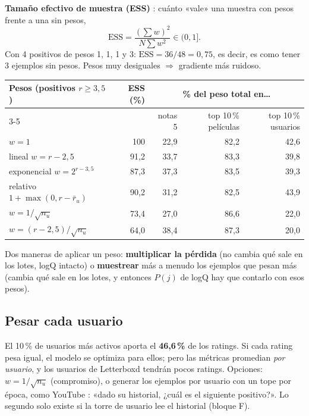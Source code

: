 \documentclass[a4paper,11pt]{article}
\begin{document}
\textbf{Tamaño efectivo de muestra (ESS)} \cite{kish1965}: cuánto «vale» una muestra con pesos frente a una sin pesos,
\[
\text{ESS}=\frac{(\sum w)^2}{N\sum w^2}\in(0,1].
\]
Con 4 positivos de pesos 1, 1, 1 y 3: $\text{ESS}=36/48=0{,}75$, es decir, es como tener 3 ejemplos sin pesos. Pesos
muy desiguales $\Rightarrow$ gradiente más ruidoso.

\begin{center}
\small
\begin{tabular}{lrrrr}
\toprule
Pesos (positivos $r\ge3{,}5$) & ESS (\%) & \multicolumn{3}{c}{\% del peso total en\dots} \\
\cmidrule(l){3-5}
 & & notas 5 & top 10\,\% películas & top 10\,\% usuarios \\
\midrule
$w=1$ & 100 & 22,9 & 82,2 & 42,6 \\
lineal $w=r-2{,}5$ & 91,2 & 33,7 & 83,3 & 39,8 \\
exponencial $w=2^{r-3{,}5}$ & 87,3 & 37,3 & 83,5 & 39,3 \\
relativo $1+\max(0,r-\bar r_u)$ & 90,2 & 31,2 & 82,5 & 43,9 \\
$w=1/\sqrt{n_u}$ & 73,4 & 27,0 & 86,6 & 22,0 \\
$w=(r-2{,}5)/\sqrt{n_u}$ & 64,0 & 38,4 & 87,3 & 20,0 \\
\bottomrule
\end{tabular}
\end{center}

Dos maneras de aplicar un peso: \textbf{multiplicar la pérdida} (no cambia qué sale en los lotes, logQ intacto) o
\textbf{muestrear} más a menudo los ejemplos que pesan más (cambia qué sale en los lotes, y entonces $P(j)$ de logQ
hay que contarlo con esos pesos).

\subsection{Pesar cada usuario}
El 10\,\% de usuarios más activos aporta el \textbf{46,6\,\%} de los ratings. Si cada rating pesa igual, el modelo se
optimiza para ellos; pero las métricas promedian \emph{por usuario}, y los usuarios de Letterboxd tendrán pocos ratings.
Opciones: $w=1/\sqrt{n_u}$ (compromiso), o generar los ejemplos por usuario con un tope por época, como YouTube
\cite{covington2016}: «dado su historial, ¿cuál es el siguiente positivo?». Lo segundo solo existe si la torre de
usuario lee el historial (bloque F).

\end{document}
